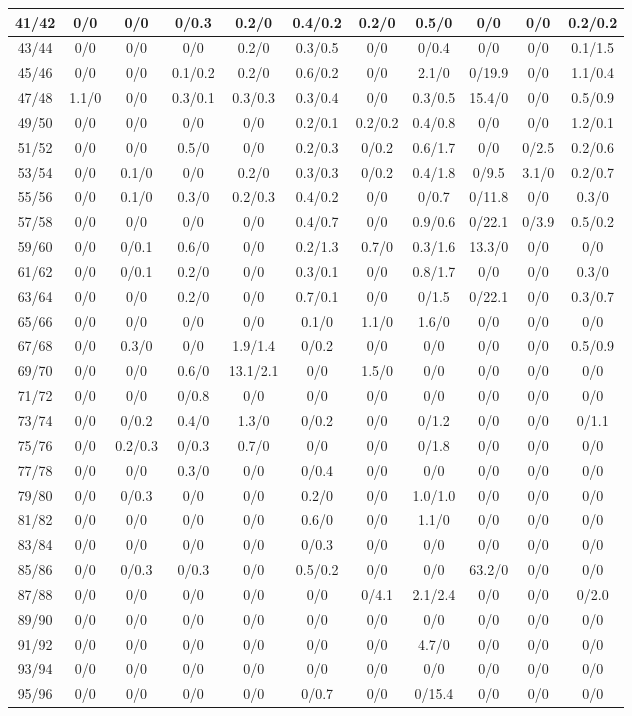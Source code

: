 \begin{table*}[htb]
\begin{tabular}{|c| c c c c c c c c c c |}
41/42&0/0& 0/0& 0/0.3& 0.2/0& 0.4/0.2& 0.2/0& 0.5/0& 0/0& 0/0& 0.2/0.2\\\hline
43/44&0/0& 0/0& 0/0& 0.2/0& 0.3/0.5& 0/0& 0/0.4& 0/0& 0/0& 0.1/1.5\\\hline
45/46&0/0& 0/0& 0.1/0.2& 0.2/0& 0.6/0.2& 0/0& 2.1/0& 0/19.9& 0/0& 1.1/0.4\\\hline
47/48&1.1/0& 0/0& 0.3/0.1& 0.3/0.3& 0.3/0.4& 0/0& 0.3/0.5& 15.4/0& 0/0& 0.5/0.9\\\hline
49/50&0/0& 0/0& 0/0& 0/0& 0.2/0.1& 0.2/0.2& 0.4/0.8& 0/0& 0/0& 1.2/0.1\\\hline
51/52&0/0& 0/0& 0.5/0& 0/0& 0.2/0.3& 0/0.2& 0.6/1.7& 0/0& 0/2.5& 0.2/0.6\\\hline
53/54&0/0& 0.1/0& 0/0& 0.2/0& 0.3/0.3& 0/0.2& 0.4/1.8& 0/9.5& 3.1/0& 0.2/0.7\\\hline
55/56&0/0& 0.1/0& 0.3/0& 0.2/0.3& 0.4/0.2& 0/0& 0/0.7& 0/11.8& 0/0& 0.3/0\\\hline
57/58&0/0& 0/0& 0/0& 0/0& 0.4/0.7& 0/0& 0.9/0.6& 0/22.1& 0/3.9& 0.5/0.2\\\hline
59/60&0/0& 0/0.1& 0.6/0& 0/0& 0.2/1.3& 0.7/0& 0.3/1.6& 13.3/0& 0/0& 0/0\\\hline
61/62&0/0& 0/0.1& 0.2/0& 0/0& 0.3/0.1& 0/0& 0.8/1.7& 0/0& 0/0& 0.3/0\\\hline
63/64&0/0& 0/0& 0.2/0& 0/0& 0.7/0.1& 0/0& 0/1.5& 0/22.1& 0/0& 0.3/0.7\\\hline
65/66&0/0& 0/0& 0/0& 0/0& 0.1/0& 1.1/0& 1.6/0& 0/0& 0/0& 0/0\\\hline
67/68&0/0& 0.3/0& 0/0& 1.9/1.4& 0/0.2& 0/0& 0/0& 0/0& 0/0& 0.5/0.9\\\hline
69/70&0/0& 0/0& 0.6/0& 13.1/2.1& 0/0& 1.5/0& 0/0& 0/0& 0/0& 0/0\\\hline
71/72&0/0& 0/0& 0/0.8& 0/0& 0/0& 0/0& 0/0& 0/0& 0/0& 0/0\\\hline
73/74&0/0& 0/0.2& 0.4/0& 1.3/0& 0/0.2& 0/0& 0/1.2& 0/0& 0/0& 0/1.1\\\hline
75/76&0/0& 0.2/0.3& 0/0.3& 0.7/0& 0/0& 0/0& 0/1.8& 0/0& 0/0& 0/0\\\hline
77/78&0/0& 0/0& 0.3/0& 0/0& 0/0.4& 0/0& 0/0& 0/0& 0/0& 0/0\\\hline
79/80&0/0& 0/0.3& 0/0& 0/0& 0.2/0& 0/0& 1.0/1.0& 0/0& 0/0& 0/0\\\hline
81/82&0/0& 0/0& 0/0& 0/0& 0.6/0& 0/0& 1.1/0& 0/0& 0/0& 0/0\\\hline
83/84&0/0& 0/0& 0/0& 0/0& 0/0.3& 0/0& 0/0& 0/0& 0/0& 0/0\\\hline
85/86&0/0& 0/0.3& 0/0.3& 0/0& 0.5/0.2& 0/0& 0/0& 63.2/0& 0/0& 0/0\\\hline
87/88&0/0& 0/0& 0/0& 0/0& 0/0& 0/4.1& 2.1/2.4& 0/0& 0/0& 0/2.0\\\hline
89/90&0/0& 0/0& 0/0& 0/0& 0/0& 0/0& 0/0& 0/0& 0/0& 0/0\\\hline
91/92&0/0& 0/0& 0/0& 0/0& 0/0& 0/0& 4.7/0& 0/0& 0/0& 0/0\\\hline
93/94&0/0& 0/0& 0/0& 0/0& 0/0& 0/0& 0/0& 0/0& 0/0& 0/0\\\hline
95/96&0/0& 0/0& 0/0& 0/0& 0/0.7& 0/0& 0/15.4& 0/0& 0/0& 0/0\\\hline


\end{tabular}
\end{table*}
